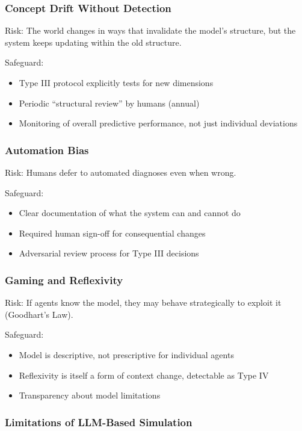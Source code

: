 \subsubsection{Concept Drift Without Detection}

Risk: The world changes in ways that invalidate the model's structure, but 
the system keeps updating within the old structure.

Safeguard:
\begin{itemize}
    \item Type III protocol explicitly tests for new dimensions
    \item Periodic ``structural review'' by humans (annual)
    \item Monitoring of overall predictive performance, not just individual deviations
\end{itemize}

\subsubsection{Automation Bias}

Risk: Humans defer to automated diagnoses even when wrong.

Safeguard:
\begin{itemize}
    \item Clear documentation of what the system can and cannot do
    \item Required human sign-off for consequential changes
    \item Adversarial review process for Type III decisions
\end{itemize}

\subsubsection{Gaming and Reflexivity}

Risk: If agents know the model, they may behave strategically to exploit it 
(Goodhart's Law).

Safeguard:
\begin{itemize}
    \item Model is descriptive, not prescriptive for individual agents
    \item Reflexivity is itself a form of context change, detectable as Type IV
    \item Transparency about model limitations
\end{itemize}

\subsubsection{Limitations of LLM-Based Simulation}

